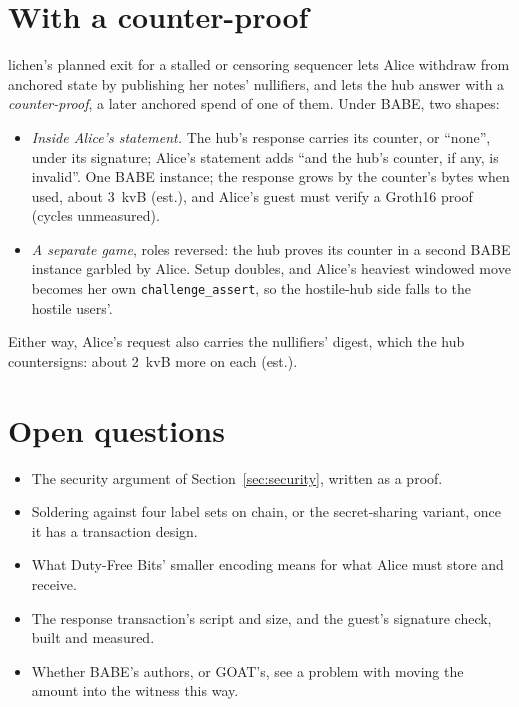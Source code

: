\documentclass[11pt]{article}
\newcommand{\tx}[1]{\texttt{#1}}
\begin{document}
\section{With a counter-proof}
\label{sec:counter}

lichen's planned exit for a stalled or censoring sequencer lets Alice
withdraw from anchored state by publishing her notes' nullifiers, and
lets the hub answer with a \emph{counter-proof}, a later anchored spend
of one of them. Under BABE, two shapes:
\begin{itemize}[leftmargin=1.5em]
\item \emph{Inside Alice's statement.} The hub's response carries its
  counter, or ``none'', under its signature; Alice's statement adds
  ``and the hub's counter, if any, is invalid''. One BABE instance; the
  response grows by the counter's bytes when used, about 3~kvB (est.),
  and Alice's guest must verify a Groth16 proof (cycles unmeasured).
\item \emph{A separate game}, roles reversed: the hub proves its counter
  in a second BABE instance garbled by Alice. Setup doubles, and Alice's
  heaviest windowed move becomes her own \tx{challenge\_assert}, so the
  hostile-hub side falls to the hostile users'.
\end{itemize}
Either way, Alice's request also carries the nullifiers' digest, which
the hub countersigns: about 2~kvB more on each (est.).

\section{Open questions}
\label{sec:open}

\begin{itemize}[leftmargin=1.5em]
\item The security argument of Section~\ref{sec:security}, written as a
  proof.
\item Soldering against four label sets on chain, or the secret-sharing
  variant, once it has a transaction design.
\item What Duty-Free Bits' smaller encoding means for what Alice must
  store and receive.
\item The response transaction's script and size, and the guest's
  signature check, built and measured.
\item Whether BABE's authors, or GOAT's, see a problem with moving the
  amount into the witness this way.
\end{itemize}
\end{document}
